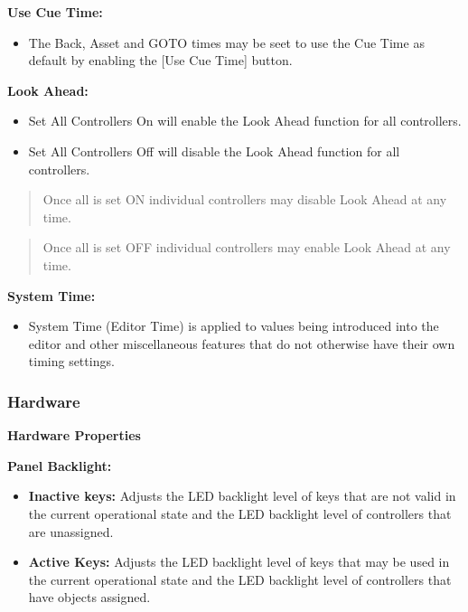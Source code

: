 \documentclass[
]{article}
\providecommand{\tightlist}{%
  \setlength{\itemsep}{0pt}\setlength{\parskip}{0pt}}
\begin{document}
\textbf{Use Cue Time:}

\begin{itemize}
\tightlist
\item
  The Back, Asset and GOTO times may be seet to use the Cue Time as default by enabling the {[}Use Cue Time{]} button.
\end{itemize}

\textbf{Look Ahead:}

\begin{itemize}
\item
  Set All Controllers On will enable the Look Ahead function for all controllers.
\item
  Set All Controllers Off will disable the Look Ahead function for all controllers.
\end{itemize}

\begin{quote}
Once all is set ON individual controllers may disable Look Ahead at any time.
\end{quote}

\begin{quote}
Once all is set OFF individual controllers may enable Look Ahead at any time.
\end{quote}

\textbf{System Time:}

\begin{itemize}
\tightlist
\item
  System Time (Editor Time) is applied to values being introduced into the editor and other miscellaneous features that do not otherwise have their own timing settings.
\end{itemize}

\hypertarget{hardware-1}{%
\subsubsection{Hardware}\label{hardware-1}}

\textbf{Hardware Properties}

\textbf{Panel Backlight:}

\begin{itemize}
\item
  \textbf{Inactive keys:} Adjusts the LED backlight level of keys that are not valid in the current operational state and the LED backlight level of controllers that are unassigned.
\item
  \textbf{Active Keys:} Adjusts the LED backlight level of keys that may be used in the current operational state and the LED backlight level of controllers that have objects assigned.
\end{itemize}
\end{document}
